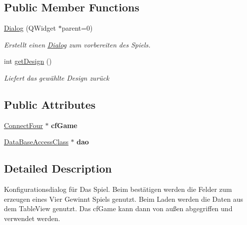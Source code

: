 \subsection*{Public Member Functions}
\begin{DoxyCompactItemize}
\item 
\hyperlink{class_dialog_acfa2063f9f962d394c6a645b6e7e08d8}{Dialog} (Q\-Widget $\ast$parent=0)
\begin{DoxyCompactList}\small\item\em Erstellt einen \hyperlink{class_dialog}{Dialog} zum vorbereiten des Spiels. \end{DoxyCompactList}\item 
int \hyperlink{class_dialog_ab9eadf76e1fd644c5242184369e27fb7}{get\-Design} ()
\begin{DoxyCompactList}\small\item\em Liefert das gewählte Design zurück \end{DoxyCompactList}\end{DoxyCompactItemize}
\subsection*{Public Attributes}
\begin{DoxyCompactItemize}
\item 
\hypertarget{class_dialog_a562fa1cf9aeae0c96dfff74fb8b2c294}{\hyperlink{class_connect_four}{Connect\-Four} $\ast$ {\bfseries cf\-Game}}\label{class_dialog_a562fa1cf9aeae0c96dfff74fb8b2c294}

\item 
\hypertarget{class_dialog_ad4e4f4a9be1b65ddd9d974fef5e53be5}{\hyperlink{class_data_base_access_class}{Data\-Base\-Access\-Class} $\ast$ {\bfseries dao}}\label{class_dialog_ad4e4f4a9be1b65ddd9d974fef5e53be5}

\end{DoxyCompactItemize}


\subsection{Detailed Description}
Konfigurationsdialog für Das Spiel. Beim bestätigen werden die Felder zum erzeugen eines Vier Gewinnt Spiels genutzt. Beim Laden werden die Daten aus dem Table\-View genutzt. Das cf\-Game kann dann von außen abgegriffen und verwendet werden. 



